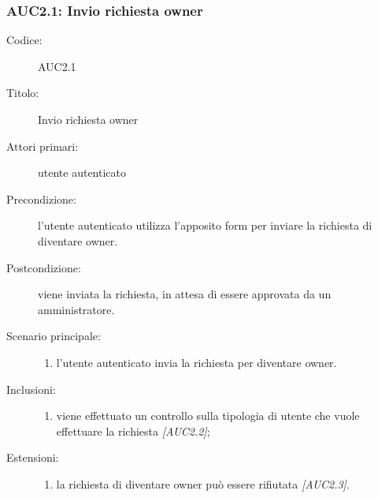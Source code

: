 \documentclass[../../../analisi-dei-requisiti.tex]{subfiles}
\begin{document}
\subsubsection{AUC2.1: Invio richiesta owner}%
\label{subs:AUC2.1}
\begin{description}
  \item[Codice:] AUC2.1
  \item[Titolo:] Invio richiesta owner
  \item[Attori primari:] utente autenticato
  \item[Precondizione:] l'utente autenticato utilizza l'apposito form per inviare la richiesta di diventare owner.
  \item[Postcondizione:] viene inviata la richiesta, in attesa di essere approvata da un amministratore.
  \item[Scenario principale:]
  \begin{enumerate}
    \item l'utente autenticato invia la richiesta per diventare owner.
  \end{enumerate}
  \item[Inclusioni:]
  \begin{enumerate}
    \item viene effettuato un controllo sulla tipologia di utente che vuole effettuare la richiesta \emph{[AUC2.2]};
  \end{enumerate}
  \item[Estensioni:]
  \begin{enumerate}
    \item la richiesta di diventare owner può essere rifiutata \emph{[AUC2.3]}.
  \end{enumerate}
\end{description}
\end{document}

